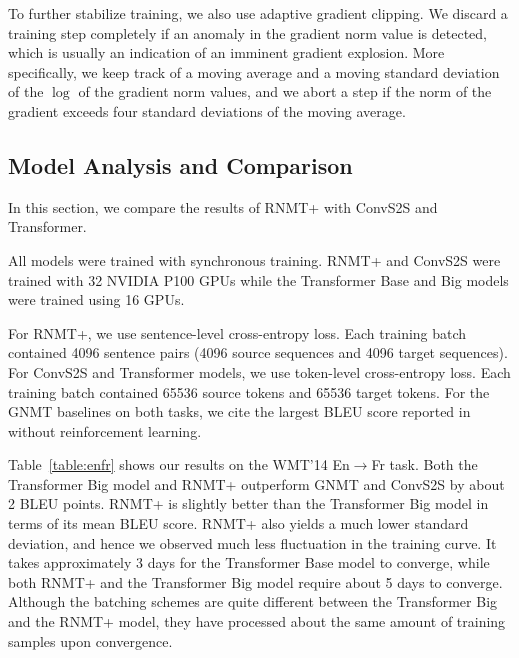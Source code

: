 \documentclass[11pt,a4paper]{article}
\begin{document}
To further stabilize training, we also use adaptive
gradient clipping. We discard a training step completely if an anomaly
in the gradient norm value is
detected, which is usually an indication of an imminent gradient explosion.
More specifically, we keep track of a moving average and a moving
standard deviation of the $\log$ of the gradient norm values, and we
abort a step if the norm of the gradient exceeds four standard deviations
of the moving average.

\subsection{Model Analysis and Comparison}

In this section, we compare the results of RNMT+ with ConvS2S and Transformer.

All models were trained with synchronous training.
RNMT+ and ConvS2S were trained with 32
NVIDIA P100 GPUs while the Transformer Base and Big models were trained using 16
GPUs.

For RNMT+, we use sentence-level cross-entropy loss. Each training batch
contained 4096 sentence pairs (4096 source sequences and 4096 target sequences).
For ConvS2S and Transformer models, we use token-level cross-entropy loss. Each
training batch contained 65536 source tokens and 65536 target tokens. For the
GNMT baselines on both tasks, we cite the largest BLEU score reported in
\cite{DBLP:journals/corr/WuSCLNMKCGMKSJL16} without reinforcement learning.

Table~\ref{table:enfr} shows our results on the WMT'14 En$\rightarrow$Fr
task. Both the Transformer Big model and RNMT+ outperform GNMT and ConvS2S by
about 2 BLEU points. RNMT+ is slightly better than the Transformer Big model in
terms of its mean BLEU score. RNMT+ also yields a much lower standard
deviation, and hence we observed much less fluctuation in the training
curve. It takes approximately 3 days for the Transformer Base model to
converge, while both RNMT+ and the Transformer Big model require about
5 days to converge. Although the batching schemes are quite different
between the Transformer Big and the RNMT+ model, they have processed about the
same amount of training samples upon convergence.
\end{document}
